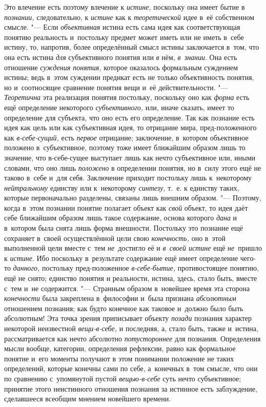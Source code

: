 Это влечение есть поэтому влечение к {\em истине,} поскольку
она имеет бытие в {\em познании,} следовательно, к {\em истине} как к
{\em теоретической} идее в~её собственном смысле. "--- Если
{\em объективная} истина
есть сама идея как соответствующая понятию реальность и~постольку предмет
может иметь или не иметь в~себе истину, то, напротив, более определённый
смысл истины заключается в~том, что она есть истина
{\em для} субъективного понятия или {\em в} нём, {\em в~знании}. Она есть
отношение {\em суждения понятия,}
которое оказалось формальным суждением истины; ведь в~этом
суждении предикат есть не только объективность понятия, но и~соотносящее
сравнение понятия вещи и~её действительности. "---
{\em Теоретична} эта реализация понятия постольку, поскольку оно как
{\em форма} есть ещё определение некоторого {\em субъективного,} или,
иначе сказать, имеет то определение для субъекта, что оно есть его
определение. Так как познание есть идея как цель или как субъективная идея,
то отрицание мира, пред-положенного как {\em в-себе-сущий,} есть
{\em первое} отрицание;
заключение, в~котором объективное положено в~субъективное, поэтому тоже
имеет ближайшим образом лишь то значение, что в-себе-сущее выступает лишь
как нечто субъективное или, иными словами, что оно лишь
{\em положено} в
определении понятия, но в~силу этого ещё не таково в~себе и~для себя.
Заключение приходит постольку лишь к~некоторому
{\em нейтральному} единству или к~некоторому {\em синтезу,} т.~е. к
единству таких, которые первоначально разделены, связаны лишь внешним
образом. "--- Поэтому, когда в~этом познании понятие полагает
объект как {\em свой}
объект, то идея даёт себе ближайшим образом лишь такое
содержание, основа которого {\em дана}
и в~котором была снята лишь форма внешности. Постольку это
познание ещё сохраняет в~своей осуществлённой цели свою
{\em конечность,} оно в~этой выполненной цели вместе с~тем
{\em не}~достигло её и {\em в~своей истине} ещё
{\em не}~пришло к {\em истине}. Ибо
поскольку в~результате содержание ещё имеет определение чего-то
{\em данного,} постольку
пред-положенное {\em в-себе-бытие,}
противостоящее понятию, ещё не снято; единство понятия и
реальности, истина, здесь, стало быть, вместе с~тем и~не содержится. "---
Странным образом в~новейшее время эта сторона {\em конечности} была
закреплена в~философии и~была признана {\em абсолютным} отношением
познания;
как будто конечное как таковое и~должно было быть абсолютным!
Эта точка зрения приписывает объекту {\em позади} познания
характер некоторой неизвестной {\em вещи-в-себе,} и
последняя, а, стало быть, также и~истина, рассматривается
как нечто абсолютно {\em потустороннее}
для познания. Определения мысли вообще, категории,
определения рефлексии, равно как формальное понятие и~его моменты получают
в этом понимании положение не таких определений, которые конечны сами по
себе, а~конечных в~том смысле, что они по сравнению с~упомянутой пустой
{\em вещью-в-себе} суть
нечто субъективное; принятие этого неистинного отношения познания за
истинное есть заблуждение, сделавшееся всеобщим мнением новейшего времени.

